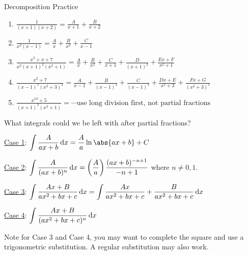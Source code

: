 \begin{Example}{Decomposition Practice}{}
    \begin{enumerate}[label=(\roman*)]
        \item $ \displaystyle \frac{1}{(x+1)(x+2)}=\frac{A}{x+1}+\frac{B}{x+2} $
        \item $ \displaystyle \frac{1}{x^2(x-1)}=\frac{A}{x} +\frac{B}{x^2}+\frac{C}{x-1} $
        \item $ \displaystyle \frac{x^3+x+7}{x^2(x+1)^2(x^2+1)}=\frac{A}{x} +\frac{B}{x^2}+\frac{C}{x+1}
                  +\frac{D}{(x+1)^2}+\frac{Ex+F}{x^2+1} $
        \item $ \displaystyle \frac{x^2+7}{(x-1)^3(x^2+3)^2}
                  =\frac{A}{x-1} +\frac{B}{(x-1)^2}+\frac{C}{(x-1)^3}+\frac{Dx+E}{x^2+3}
                  +\frac{Fx+G}{(x^2+3)^3} $
        \item $ \displaystyle \frac{x^{10}+5}{(x+1)^3(x^2+1)}=\cdots\text{use long division first, not partial
                      fractions} $
    \end{enumerate}
\end{Example}

\begin{Remark}{What integrals could we be left with after partial fractions?}{}

    \underline{Case 1}: $ \displaystyle \int \frac{A}{ax+b} \odif{x} =\frac{A}{a}\ln\abs{ax+b}+C $

    \underline{Case 2}: $ \displaystyle \int \frac{A}{(ax+b)^n} \odif{x} =\left( \frac{A}{a} \right) \frac{(ax+b)^{-n+1}}{-n+1} $
    where $ n\neq 0,1 $.

    \underline{Case 3}: $ \displaystyle \int \frac{Ax+B}{ax^2+bx+c}\odif{x} =\int \frac{Ax}{ax^2+bx+c} +\frac{B}{ax^2+bx+c} \odif{x}  $

    \underline{Case 4}: $ \displaystyle \int \frac{Ax+B}{(ax^2+bx+c)^n}\odif{x} $

    Note for Case 3 and Case 4, you may want to complete the square and use a trigonometric
    substitution. A regular substitution may also work.
\end{Remark}

